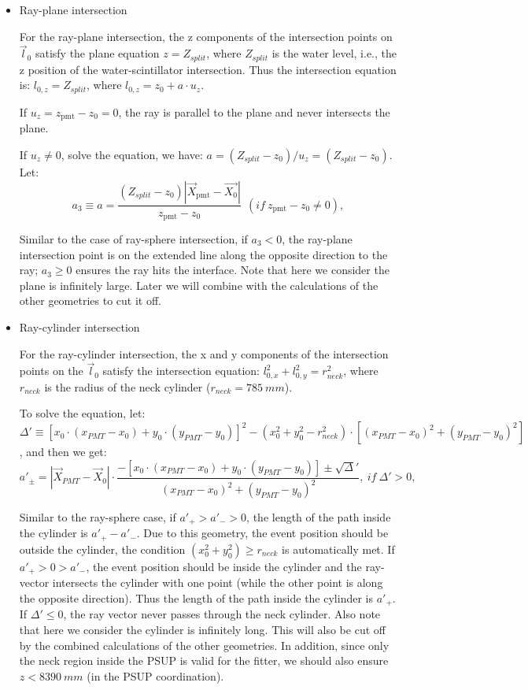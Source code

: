 \begin{itemize}
\item Ray-plane intersection

For the ray-plane intersection, the z components of the intersection points on $\vec{l}_0$ satisfy the plane equation $z=Z_{split}$, where $Z_{split}$ is the water level, i.e., the z position of the water-scintillator intersection. Thus the intersection equation is:
$l_{0,z}=Z_{split}$, where $l_{0,z}=z_0+a\cdot u_z$.

If $u_z=z_\mathrm{pmt}-z_0=0$, the ray is parallel to the plane and never intersects the plane.

If $u_z\neq 0$, solve the equation, we have: $a=(Z_{split}-z_0)/u_z=(Z_{split}-z_0)$.
Let: 
\begin{equation}
a_3 \equiv a = \frac{(Z_{split}-z_0)|\vec{X}_{\mathrm{pmt}}-\vec{X_0}|}{z_\mathrm{pmt}-z_0}~~(if ~z_\mathrm{pmt}-z_0\neq 0),
\end{equation}

Similar to the case of ray-sphere intersection, if $a_3<0$, the ray-plane intersection point is on the extended line along the opposite direction to the ray; $a_3 \geq 0$ ensures the ray hits the interface. Note that here we consider the plane is infinitely large. Later we will combine with the calculations of the other geometries to cut it off. 

\item Ray-cylinder intersection

For the ray-cylinder intersection, the x and y components of the intersection points on the $\vec l_0$ satisfy the intersection equation: $l^2_{0,x}+l^2_{0,y} = r^2_{neck}$, where $r_{neck}$ is the radius of the neck cylinder ($r_{neck}=785~mm$).

To solve the equation,  let: $\Delta'\equiv [x_0\cdot (x_{PMT}-x_0)+y_0\cdot(y_{PMT}-y_0)]^2 - ( x_0^2+y_0^2-r^2_{neck})\cdot [(x_{PMT}-x_0)^2+(y_{PMT}-y_0)^2]$, and then we get: 
\begin{equation}\label{eq:ray-cylinder}
a'_{\pm} = |\vec{X}_{PMT}-\vec{X}_0|\cdot\frac{-[x_0\cdot (x_{PMT}-x_0)+y_0\cdot(y_{PMT}-y_0)] \pm \sqrt\Delta' }{(x_{PMT}-x_0)^2+(y_{PMT}-y_0)^2},~if~\Delta'>0,
\end{equation}

Similar to the ray-sphere case, if $a'_{+}>a'_->0$, the length of the path inside the cylinder is $a'_+-a'_-$. Due to this geometry, the event position should be outside the cylinder, the condition $(x^2_0+y^2_0)\geq r_{neck}$ is automatically met. If $a'_+>0>a'_-$, the event position should be inside the cylinder and the ray-vector intersects the cylinder with one point (while the other point is along the opposite direction). Thus the length of the path inside the cylinder is $a'_+$. If $\Delta'\leq0$, the ray vector never passes through the neck cylinder. Also note that here we consider the cylinder is infinitely long. This will also be cut off by the combined calculations of the other geometries. In addition, since only the neck region inside the PSUP is valid for the fitter, we should also ensure $z<8390~mm$ (in the PSUP coordination).

\end{itemize}

